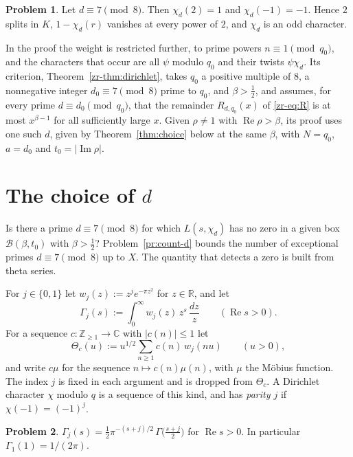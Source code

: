 \documentclass[reqno]{amsart}
\theoremstyle{definition}
\newtheorem{problem}{Problem}[section]
\theoremstyle{plain}
\theoremstyle{remark}
\newcommand{\Z}{\mathbb{Z}}
\newcommand{\C}{\mathbb{C}}
\newcommand{\R}{\mathbb{R}}
\renewcommand{\Re}{\operatorname{Re}}
\renewcommand{\Im}{\operatorname{Im}}
\newcommand{\Bx}{\mathcal{B}}
\begin{document}
\begin{problem}\label{pr:congruences}
Let $d \equiv 7 \pmod 8$.  Then $\chi_d(2) = 1$ and $\chi_d(-1) = -1$.  Hence $2$ splits in $K$, $1 - \chi_d(r)$ vanishes at every power of $2$, and $\chi_d$ is an odd character.
\end{problem}

In the proof the weight is restricted further, to prime powers $n \equiv 1 \pmod{q_0}$, and the characters that occur are all $\psi$ modulo $q_0$ and their twists $\psi\chi_d$.  Its criterion, Theorem~\ref{zr-thm:dirichlet}, takes $q_0$ a positive multiple of $8$, a nonnegative integer $d_0 \equiv 7 \pmod 8$ prime to $q_0$, and $\beta > \frac12$, and assumes, for every prime $d \equiv d_0 \pmod{q_0}$, that the remainder $R_{d, q_0}(x)$ of \eqref{zr-eq:R} is at most $x^{\beta - 1}$ for all sufficiently large $x$.  Given $\rho \ne 1$ with $\Re \rho > \beta$, its proof uses one such $d$, given by Theorem~\ref{thm:choice} below at the same $\beta$, with $N = q_0$, $a = d_0$ and $t_0 = \lvert \Im\rho \rvert$.


\section{The choice of \texorpdfstring{$d$}{d}}\label{sec:choice}

Is there a prime $d \equiv 7 \pmod 8$ for which $L(s, \chi_d)$ has no zero in a given box $\Bx(\beta, t_0)$ with $\beta > \frac12$?  Problem~\ref{pr:count-d} bounds the number of exceptional primes $d \equiv 7 \pmod 8$ up to $X$.  The quantity that detects a zero is built from theta series.

For $j \in \{0, 1\}$ let $w_j(z) := z^j e^{-\pi z^2}$ for $z \in \R$, and let
\[
  \Gamma_j(s) := \int_0^\infty w_j(z)\, z^{s} \, \frac{d z}{z} \qquad (\Re s > 0) .
\]
For a sequence $c \colon \Z_{\ge 1} \to \C$ with $\lvert c(n) \rvert \le 1$ let
\[
  \Theta_c(u) := u^{1/2} \sum_{n \ge 1} c(n)\, w_j(n u) \qquad (u > 0),
\]
and write $c\mu$ for the sequence $n \mapsto c(n)\mu(n)$, with $\mu$ the M\"obius function.  The index $j$ is fixed in each argument and is dropped from $\Theta_c$.  A Dirichlet character $\chi$ modulo $q$ is a sequence of this kind, and has \emph{parity $j$} if $\chi(-1) = (-1)^j$.

\begin{problem}\label{pr:gamma}
$\Gamma_j(s) = \frac12 \pi^{-(s+j)/2}\, \Gamma\bigl(\frac{s+j}{2}\bigr)$ for $\Re s > 0$.  In particular $\Gamma_1(1) = 1/(2\pi)$.
\end{problem}
\end{document}
